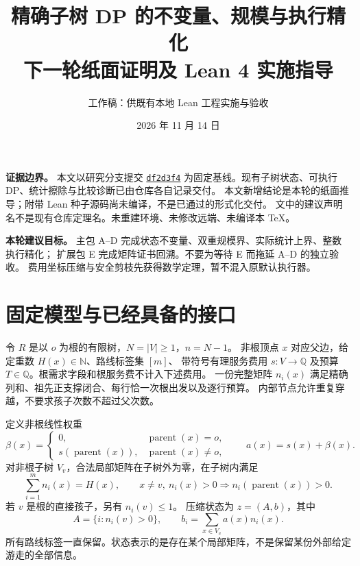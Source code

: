 \documentclass[UTF8,a4paper,11pt]{ctexart}
\title{精确子树 DP 的不变量、规模与执行精化\\下一轮纸面证明及 Lean 4 实施指导}
\author{工作稿：供既有本地 Lean 工程实施与验收}
\date{2026 年 11 月 14 日}
\theoremstyle{definition}
\newcommand{\N}{\mathbb N}
\newcommand{\Q}{\mathbb Q}
\begin{document}
\maketitle

\noindent\textbf{证据边界。}
本文以研究分支提交
\href{https://github.com/huam54925-cpu/uav-routing-certification/commit/df2d3f46bafb15b1d0943105e5b3ce3fc63912d7}{\texttt{df2d3f4}}
为固定基线。现有子树状态、可执行 DP、统计擦除与比较诊断已由仓库各自记录交付。
本文新增结论是本轮的纸面推导；附带 Lean 种子源码尚未编译，不是已通过的形式化交付。
文中的建议声明名不是现有仓库定理名。未重建环境、未修改远端、未编译本 TeX。

\noindent\textbf{本轮建议目标。}
主包 A--D 完成状态不变量、双重规模界、实际统计上界、整数执行精化；
扩展包 E 完成矩阵证书回溯。不要为等待 E 而拖延 A--D 的独立验收。
费用坐标压缩与安全剪枝先获得数学定理，暂不混入原默认执行器。

\tableofcontents

\section{固定模型与已经具备的接口}

令 $R$ 是以 $o$ 为根的有限树，$N=|V|\ge1$，$n=N-1$。
非根顶点 $x$ 对应父边，给定重数 $H(x)\in\N$、路线标签集 $[m]$、
带符号有理服务费用 $s:V\to\Q$ 及预算 $T\in\Q$。根需求字段和根服务费不计入下述费用。
一份完整矩阵 $n_i(x)$ 满足精确列和、祖先正支撑闭合、每行恰一次根出发以及逐行预算。
内部节点允许重复穿越，不要求孩子次数不超过父次数。

定义非根线性权重
\[
 \beta(x)=\begin{cases}0,&\operatorname{parent}(x)=o,\\
 s(\operatorname{parent}(x)),&\operatorname{parent}(x)\ne o,
 \end{cases}\qquad a(x)=s(x)+\beta(x).
\]
对非根子树 $V_v$，合法局部矩阵在子树外为零，在子树内满足
\[
 \sum_{i=1}^m n_i(x)=H(x),\qquad
 x\ne v,\ n_i(x)>0\Longrightarrow n_i(\operatorname{parent}(x))>0.
\]
若 $v$ 是根的直接孩子，另有 $n_i(v)\le1$。
压缩状态为 $z=(A,b)$，其中
\[
 A=\{i:n_i(v)>0\},\qquad b_i=\sum_{x\in V_v}a(x)n_i(x).
\]
所有路线标签一直保留。状态表示的是存在某个局部矩阵，不是保留某份外部给定游走的全部信息。
\end{document}
